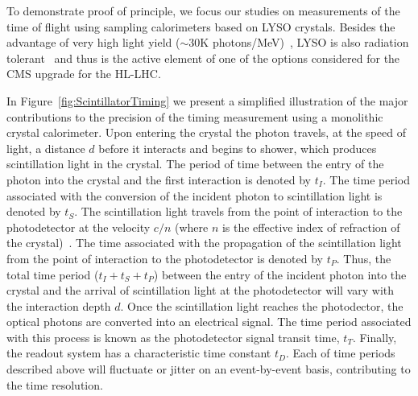 \documentclass[12pt]{article}
\begin{document}
To demonstrate proof of principle, we focus our studies on
measurements of the time of flight using sampling calorimeters
based on LYSO crystals. Besides the advantage of very high light
yield ($\sim 30$K photons/MeV)~\cite{LYSOProperties}, LYSO is also radiation tolerant~\cite{5402126, 4291695, 5402125, Dissertori:2013rma} and
thus is the active element of one of the options considered 
for the CMS upgrade for the HL-LHC. 

In Figure~\ref{fig:ScintillatorTiming} we present a simplified illustration 
of the major contributions to the precision of the timing measurement using a 
monolithic crystal calorimeter.  Upon entering the crystal the photon travels, 
at the speed of light, a distance $d$ before it interacts and begins to shower, 
which produces scintillation light in the crystal. The period of time between the 
entry of the photon into the crystal and the first interaction is denoted by $t_I$. 
The time period associated with the conversion of the incident photon to 
scintillation light is denoted by $t_S$. The scintillation light travels from 
the point of interaction to the photodetector at the velocity $c/n$ (where $n$ 
is the effective index of refraction of the crystal)~\cite{Moses}. The time associated 
with the propagation of the scintillation light from the point of interaction 
to the photodetector is denoted by $t_P$. Thus, the total time period ($t_I+t_S+t_P$) 
between the entry of the incident photon into the crystal and the arrival of 
scintillation light at the photodetector will vary with the interaction depth $d$. 
Once the scintillation light reaches the photodector, the optical photons are 
converted into an electrical signal. The time period associated with this process 
is known as the photodetector signal transit time, $t_T$.  Finally, the readout 
system has a characteristic time constant $t_D$. Each of time periods described 
above will fluctuate or jitter on an event-by-event basis, contributing to the 
time resolution.


\end{document}
